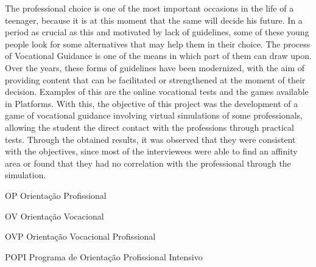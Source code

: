 \documentclass[
	12pt,				%
    oneside,			%
	a4paper,			%
	english,			%
	french,				%
	spanish,			%
	brazil,				%
	]{abntex2}
\begin{document}
\begin{resumo}[Abstract]

    The professional choice is one of the most important occasions in the life of a teenager, because it is at this moment that the same will decide his future. In a period as crucial as this and motivated by lack of guidelines, some of these young people look for some alternatives that may help them in their choice. The process of Vocational Guidance is one of the means in which part of them can draw upon. Over the years, these forms of guidelines have been modernized, with the aim of providing content that can be facilitated or strengthened at the moment of their decision. Examples of this are the online vocational tests and the games available in Platforms. With this, the objective of this project was the development of a game of vocational guidance involving virtual simulations of some professionals, allowing the student the direct contact with the professions through practical tests. Through the obtained results, it was observed that they were consistent with the objectives, since most of the interviewees were able to find an affinity area or found that they had no correlation with the professional through the simulation.
    
\end{resumo}



\listoffigures* %
\cleardoublepage %


\listoftables*
\cleardoublepage

\begin{siglas}
  \item[OP] Orientação Profissional
  \item[OV] Orientação Vocacional
  \item[OVP] Orientação Vocacional Profissional
  \item[POPI] Programa de Orientação Profissional Intensivo
\end{siglas}


\tableofcontents*


\textual
\end{document}
